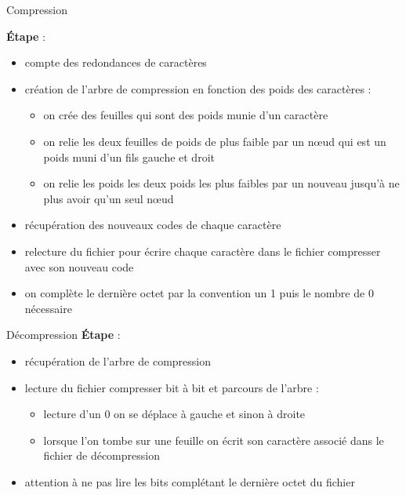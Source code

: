 \documentclass[french]{beamer}
\begin{document}
\begin{frame}{Compression}

	\textbf{Étape} :\\
	
\begin{itemize}
	\item compte des redondances de caractères
	\item création de l'arbre de compression en fonction des poids des caractères :
		\begin{itemize}
			\item on crée des feuilles qui sont des poids munie d'un caractère
			\item on relie les deux feuilles de poids de plus faible par un nœud qui est un poids muni d'un fils gauche et droit
			\item on relie les poids les deux poids les plus faibles par un nouveau  jusqu'à ne plus avoir qu'un seul nœud
		\end{itemize}
	\item récupération des nouveaux codes de chaque caractère
	\item relecture du fichier pour écrire chaque caractère dans le fichier compresser avec son nouveau code
	\item on complète le dernière octet par la convention un 1 puis le nombre de 0 nécessaire
	\end{itemize}

\end{frame}

\begin{frame}{Décompression}
\textbf{Étape} :\\
\begin{itemize}
\item<1-5> récupération de l'arbre de compression
\item<2-5> lecture du fichier compresser bit à bit et parcours de l'arbre :
	\begin{itemize}
		\item<3-5> lecture d'un 0 on se déplace à gauche et sinon à droite
		\item<4-5> lorsque l'on tombe sur une feuille on écrit son caractère associé dans le fichier de décompression
	\end{itemize}
\item<5> attention à ne pas lire les bits complétant le dernière octet du fichier
\end{itemize}
\end{frame}
\end{document}

